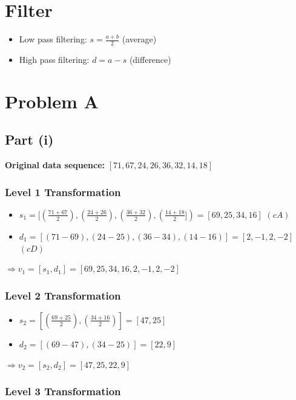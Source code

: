 \documentclass[12pt]{article}
\begin{document}
\section{Filter}

\begin{itemize}
    \item Low pass filtering: $s = \frac{a + b}{2}$ (average)
    \item High pass filtering: $d = a - s$ (difference)
\end{itemize}

\section{Problem A}

\subsection{Part (i)}

\textbf{Original data sequence:} $[71, 67, 24, 26, 36, 32, 14, 18]$

\subsubsection{Level 1 Transformation}

\begin{itemize}
    \item $s_1 = [(\frac{71 + 67}{2}), (\frac{24 + 26}{2}), (\frac{36 + 32}{2}), (\frac{14 + 18}{2}]) = [69, 25, 34, 16]$ $(cA)$
    \item $d_1 = [(71-69), (24-25), (36-34), (14-16)]  = [2, -1, 2, -2]$ $(cD)$
\end{itemize}

$\Rightarrow v_1 = [s_1, d_1] = [69, 25, 34, 16, 2, -1, 2, -2]$

\subsubsection{Level 2 Transformation}

\begin{itemize}
    \item $s_2 = [(\frac{69 + 25}{2}), (\frac{34 + 16}{2})] = [47, 25]$
    \item $d_2 = [(69-47), (34-25)]  = [22, 9]$
\end{itemize}

$\Rightarrow v_2 = [s_2, d_2] = [47, 25, 22, 9]$

\subsubsection{Level 3 Transformation}
\end{document}
